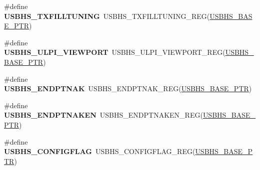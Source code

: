 \begin{DoxyCompactItemize}
\item 
\hypertarget{group___u_s_b_h_s___register___accessor___macros_ga649948d470fa61a4671769037a22dd41}{}\#define {\bfseries U\+S\+B\+H\+S\+\_\+\+T\+X\+F\+I\+L\+L\+T\+U\+N\+I\+N\+G}~U\+S\+B\+H\+S\+\_\+\+T\+X\+F\+I\+L\+L\+T\+U\+N\+I\+N\+G\+\_\+\+R\+E\+G(\hyperlink{group___u_s_b_h_s___peripheral_gaa2bc10b8cd66f96acd39e15b3a581306}{U\+S\+B\+H\+S\+\_\+\+B\+A\+S\+E\+\_\+\+P\+T\+R})\label{group___u_s_b_h_s___register___accessor___macros_ga649948d470fa61a4671769037a22dd41}

\item 
\hypertarget{group___u_s_b_h_s___register___accessor___macros_gaff44610e735eabc10e79577b89f4052d}{}\#define {\bfseries U\+S\+B\+H\+S\+\_\+\+U\+L\+P\+I\+\_\+\+V\+I\+E\+W\+P\+O\+R\+T}~U\+S\+B\+H\+S\+\_\+\+U\+L\+P\+I\+\_\+\+V\+I\+E\+W\+P\+O\+R\+T\+\_\+\+R\+E\+G(\hyperlink{group___u_s_b_h_s___peripheral_gaa2bc10b8cd66f96acd39e15b3a581306}{U\+S\+B\+H\+S\+\_\+\+B\+A\+S\+E\+\_\+\+P\+T\+R})\label{group___u_s_b_h_s___register___accessor___macros_gaff44610e735eabc10e79577b89f4052d}

\item 
\hypertarget{group___u_s_b_h_s___register___accessor___macros_gae5dcf87826bd879a36b472044a42af2f}{}\#define {\bfseries U\+S\+B\+H\+S\+\_\+\+E\+N\+D\+P\+T\+N\+A\+K}~U\+S\+B\+H\+S\+\_\+\+E\+N\+D\+P\+T\+N\+A\+K\+\_\+\+R\+E\+G(\hyperlink{group___u_s_b_h_s___peripheral_gaa2bc10b8cd66f96acd39e15b3a581306}{U\+S\+B\+H\+S\+\_\+\+B\+A\+S\+E\+\_\+\+P\+T\+R})\label{group___u_s_b_h_s___register___accessor___macros_gae5dcf87826bd879a36b472044a42af2f}

\item 
\hypertarget{group___u_s_b_h_s___register___accessor___macros_gad1d26bcdf8880c11bccad821a6727adf}{}\#define {\bfseries U\+S\+B\+H\+S\+\_\+\+E\+N\+D\+P\+T\+N\+A\+K\+E\+N}~U\+S\+B\+H\+S\+\_\+\+E\+N\+D\+P\+T\+N\+A\+K\+E\+N\+\_\+\+R\+E\+G(\hyperlink{group___u_s_b_h_s___peripheral_gaa2bc10b8cd66f96acd39e15b3a581306}{U\+S\+B\+H\+S\+\_\+\+B\+A\+S\+E\+\_\+\+P\+T\+R})\label{group___u_s_b_h_s___register___accessor___macros_gad1d26bcdf8880c11bccad821a6727adf}

\item 
\hypertarget{group___u_s_b_h_s___register___accessor___macros_gae5244b12202381e345e530432f1d3dbc}{}\#define {\bfseries U\+S\+B\+H\+S\+\_\+\+C\+O\+N\+F\+I\+G\+F\+L\+A\+G}~U\+S\+B\+H\+S\+\_\+\+C\+O\+N\+F\+I\+G\+F\+L\+A\+G\+\_\+\+R\+E\+G(\hyperlink{group___u_s_b_h_s___peripheral_gaa2bc10b8cd66f96acd39e15b3a581306}{U\+S\+B\+H\+S\+\_\+\+B\+A\+S\+E\+\_\+\+P\+T\+R})\label{group___u_s_b_h_s___register___accessor___macros_gae5244b12202381e345e530432f1d3dbc}


\end{DoxyCompactItemize}
